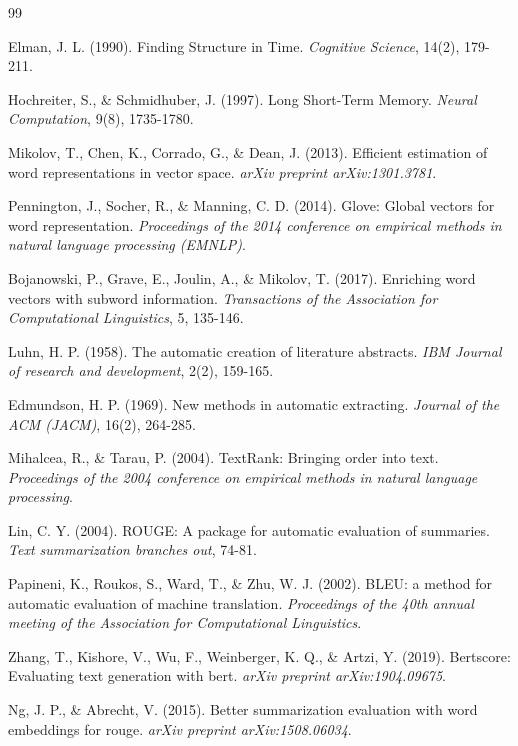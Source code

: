\begin{thebibliography}{99}

Elman, J. L. (1990). Finding Structure in Time. \textit{Cognitive Science}, 14(2), 179-211.

Hochreiter, S., \& Schmidhuber, J. (1997). Long Short-Term Memory. \textit{Neural Computation}, 9(8), 1735-1780.

Mikolov, T., Chen, K., Corrado, G., \& Dean, J. (2013). Efficient estimation of word representations in vector space. \textit{arXiv preprint arXiv:1301.3781}.

Pennington, J., Socher, R., \& Manning, C. D. (2014). Glove: Global vectors for word representation. \textit{Proceedings of the 2014 conference on empirical methods in natural language processing (EMNLP)}.

Bojanowski, P., Grave, E., Joulin, A., \& Mikolov, T. (2017). Enriching word vectors with subword information. \textit{Transactions of the Association for Computational Linguistics}, 5, 135-146.

Luhn, H. P. (1958). The automatic creation of literature abstracts. \textit{IBM Journal of research and development}, 2(2), 159-165.

Edmundson, H. P. (1969). New methods in automatic extracting. \textit{Journal of the ACM (JACM)}, 16(2), 264-285.

Mihalcea, R., \& Tarau, P. (2004). TextRank: Bringing order into text. \textit{Proceedings of the 2004 conference on empirical methods in natural language processing}.

Lin, C. Y. (2004). ROUGE: A package for automatic evaluation of summaries. \textit{Text summarization branches out}, 74-81.

Papineni, K., Roukos, S., Ward, T., \& Zhu, W. J. (2002). BLEU: a method for automatic evaluation of machine translation. \textit{Proceedings of the 40th annual meeting of the Association for Computational Linguistics}.

Zhang, T., Kishore, V., Wu, F., Weinberger, K. Q., \& Artzi, Y. (2019). Bertscore: Evaluating text generation with bert. \textit{arXiv preprint arXiv:1904.09675}.

Ng, J. P., \& Abrecht, V. (2015). Better summarization evaluation with word embeddings for rouge. \textit{arXiv preprint arXiv:1508.06034}.


\end{thebibliography}
